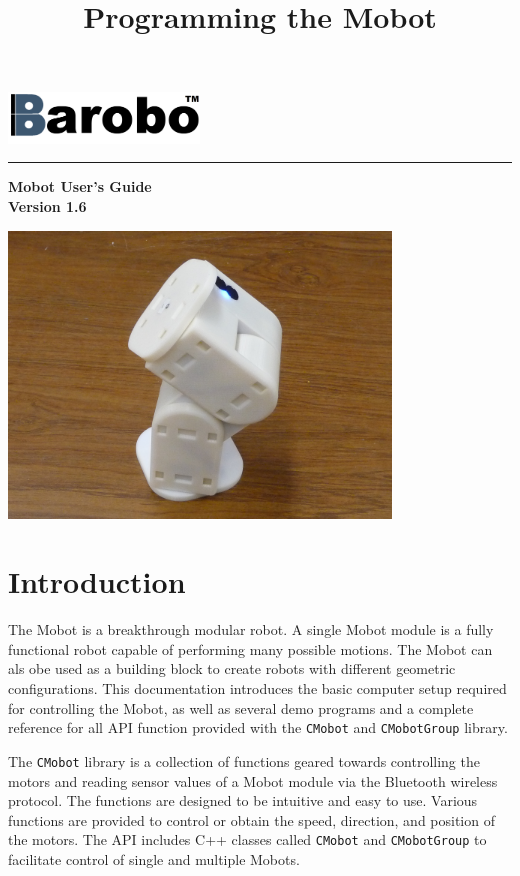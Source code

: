 \documentclass{article}
\title{Programming the Mobot}
\begin{document}
\includegraphics[width=2in]{images/Barobo.png}
\hrule
\begin{center}
\vspace*{2.5cm}
{\Huge\sf\bf Mobot User's Guide}\\
\vspace*{2.5cm}
{\Large\bf Version 1.6}
\vspace{4.5cm}

\includegraphics[width=4in]{images/Mobot_Camera_Stand.JPG}
\end{center}


\newpage
\tableofcontents
\newpage
\section{Introduction}
The Mobot is a breakthrough modular robot. A single Mobot module is a fully 
functional robot capable of performing many possible motions. The Mobot
can als obe used as a building block to create robots with different
geometric configurations. 
This documentation introduces the basic computer setup required for controlling 
the Mobot, as well as several demo programs and a complete reference for all
API function provided with the \texttt{CMobot} and \texttt{CMobotGroup} library.

The \texttt{CMobot} library is a collection of functions geared towards
controlling the motors and reading sensor values of a Mobot module via the
Bluetooth wireless protocol. The functions are designed to be intuitive
and easy to use. Various functions are provided to control or obtain the speed,
direction, and position of the motors. The API includes C++ classes called
\texttt{CMobot} and \texttt{CMobotGroup} to facilitate control of 
single and multiple Mobots.
\end{document}

